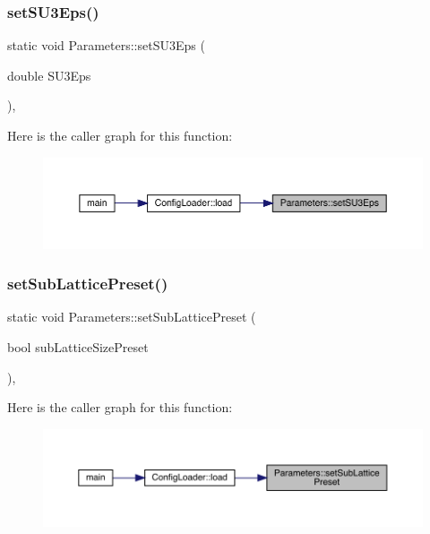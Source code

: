 \subsubsection{\texorpdfstring{setSU3Eps()}{setSU3Eps()}}
{\footnotesize\ttfamily static void Parameters\+::set\+S\+U3\+Eps (\begin{DoxyParamCaption}\item[{double}]{S\+U3\+Eps }\end{DoxyParamCaption})\hspace{0.3cm}{\ttfamily [inline]}, {\ttfamily [static]}}

Here is the caller graph for this function\+:\nopagebreak
\begin{figure}[H]
\begin{center}
\leavevmode
\includegraphics[width=350pt]{class_parameters_af882fdb68c96c27f1bb99cebe3aecd21_icgraph}
\end{center}
\end{figure}
\mbox{\label{class_parameters_a95d3c7f35ed0421419d98faecb2c23e8}} 
\subsubsection{\texorpdfstring{setSubLatticePreset()}{setSubLatticePreset()}}
{\footnotesize\ttfamily static void Parameters\+::set\+Sub\+Lattice\+Preset (\begin{DoxyParamCaption}\item[{bool}]{sub\+Lattice\+Size\+Preset }\end{DoxyParamCaption})\hspace{0.3cm}{\ttfamily [inline]}, {\ttfamily [static]}}

Here is the caller graph for this function\+:\nopagebreak
\begin{figure}[H]
\begin{center}
\leavevmode
\includegraphics[width=350pt]{class_parameters_a95d3c7f35ed0421419d98faecb2c23e8_icgraph}
\end{center}
\end{figure}
\mbox{\label{class_parameters_a978f5547036311816f21e3ebe8af77fc}} 
